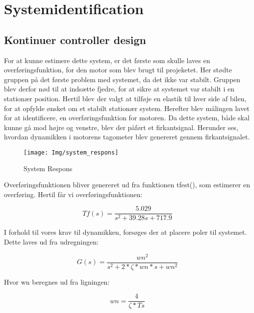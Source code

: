 \graphicspath{{Chapters/Systemforlob/}}

\section{Systemidentification}

\subsection{Kontinuer controller design}

For at kunne estimere dette system, er det første som skulle laves en overføringsfunktion, for den motor som blev brugt til projeketet. Her stødte gruppen på det første problem med systemet, da det ikke var stabilt. Gruppen blev derfor nød til at indsætte fjedre, for at sikre at systemet var stabilt i en stationær position. Hertil blev der valgt at tilføje en elastik til hver side af bilen, for at opfylde ønsket om et stabilt stationær system. 
Herefter blev målingen lavet for at identificere, en overføringsfunktion for motoren. Da dette system, både skal kunne gå mod højre og venstre, blev der påført et firkantsignal. Herunder ses, hvordan dynamikken i motorens tagometer blev genereret gennem firkantsignalet.      
   

\begin{figure}[H]
	\centering
	\texttt{[image: Img/system\_respons]}
	\caption{System Respons}
	\label{fig:system_respons}
\end{figure}

Overføringsfunktionen bliver genereret ud fra funktionen tfest(), som estimerer en overføring. Hertil får vi overføringsfunktionen:

\begin{equation}
  Tf(s) = \frac{5.029}{s^2 + 39.28 s + 717.9}
\end{equation}

I forhold til vores krav til dynamikken, forsøges der at placere poler til systemet. Dette laves ud fra udregningen: 


\begin{equation}
  G(s) = \frac{wn^2}{s^2+2*\zeta*wn*s+wn^2}
\end{equation}

Hvor wn beregnes ud fra ligningen:

\begin{equation}
  wn = \frac{4}{\zeta*Ts}
\end{equation} 

